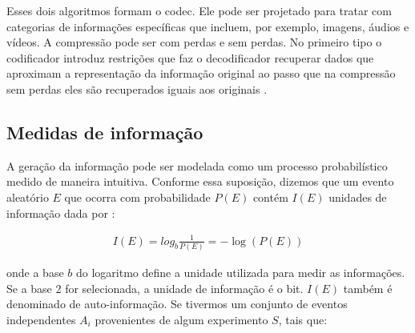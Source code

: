 
Esses dois algoritmos formam o \acrshort{codec}. Ele pode ser projetado para tratar com categorias de informações específicas que incluem, por exemplo, imagens, áudios e vídeos. 
A compressão pode ser com perdas e sem perdas. No primeiro tipo o codificador introduz restrições que faz o decodificador recuperar dados que aproximam a representação da informação original ao passo que na compressão sem perdas  eles são recuperados iguais aos originais \cite{sayood2017introduction}. 

\subsection{Medidas de informação}


A geração da informação pode ser modelada como um processo probabilístico medido de maneira intuitiva. Conforme essa suposição, dizemos que um evento aleatório $E$ que ocorra com probabilidade $P(E)$ contém $I(E)$ unidades de informação dada por \cite{marques1999processamento}:

\begin{equation}
\begin{aligned}
I(E) = log_{b}\frac{1}{P(E)} = - \log (P(E)) 
\end{aligned}
\end{equation}

onde a base $b$ do logaritmo define a unidade utilizada para medir as informações. Se a base 2 for selecionada, a unidade de informação é o bit. $I(E)$ também é denominado de auto-informação. Se tivermos um conjunto de eventos independentes $A_i$ provenientes de algum experimento $S$, tais que:

